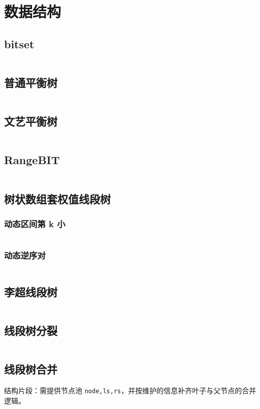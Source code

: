\section{数据结构}
				\subsection{bitset}
					\inputminted{cpp}{sections/DataStructures/assets/DataStructure/bitset.cpp}
				\subsection{普通平衡树}
					\inputminted{cpp}{sections/DataStructures/assets/DataStructure/普通平衡树.cpp}
				\subsection{文艺平衡树}
					\inputminted{cpp}{sections/DataStructures/assets/DataStructure/文艺平衡树.cpp}
				\subsection{RangeBIT}
					\inputminted{cpp}{sections/DataStructures/assets/DataStructure/RangeBIT.cpp}
				\subsection{树状数组套权值线段树}
					\subsubsection{动态区间第 k 小}
					\inputminted{cpp}{sections/DataStructures/assets/DataStructure/动态区间第k小.cpp}
					\subsubsection{动态逆序对}
					\inputminted{cpp}{sections/DataStructures/assets/DataStructure/动态逆序对.cpp}
				\subsection{李超线段树}
					\inputminted{cpp}{sections/DataStructures/assets/DataStructure/李超线段树.cpp}
				\subsection{线段树分裂}
					\inputminted{cpp}{sections/DataStructures/assets/DataStructure/线段树分裂.cpp}
				\subsection{线段树合并}
					结构片段：需提供节点池 \texttt{node,ls,rs}，并按维护的信息补齐叶子与父节点的合并逻辑。
					\inputminted{cpp}{sections/DataStructures/assets/DataStructure/线段树合并.cpp}
